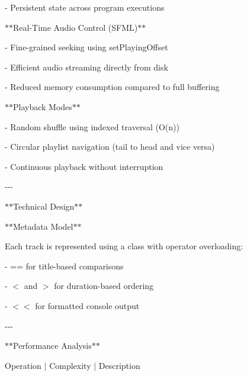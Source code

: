 -\/ Persistent state across program executions ~\newline


\texorpdfstring{$\ast$}{*}\texorpdfstring{$\ast$}{*}\+Real-\/\+Time Audio Control (SFML)\texorpdfstring{$\ast$}{*}\texorpdfstring{$\ast$}{*}

-\/ Fine-\/grained seeking using set\+Playing\+Offset ~\newline


-\/ Efficient audio streaming directly from disk ~\newline


-\/ Reduced memory consumption compared to full buffering ~\newline


\texorpdfstring{$\ast$}{*}\texorpdfstring{$\ast$}{*}\+Playback Modes\texorpdfstring{$\ast$}{*}\texorpdfstring{$\ast$}{*}

-\/ Random shuffle using indexed traversal (O(n)) ~\newline


-\/ Circular playlist navigation (tail to head and vice versa) ~\newline


-\/ Continuous playback without interruption ~\newline


-\/-\/-\/

\texorpdfstring{$\ast$}{*}\texorpdfstring{$\ast$}{*}\+Technical Design\texorpdfstring{$\ast$}{*}\texorpdfstring{$\ast$}{*}

\texorpdfstring{$\ast$}{*}\texorpdfstring{$\ast$}{*}\+Metadata Model\texorpdfstring{$\ast$}{*}\texorpdfstring{$\ast$}{*}

Each track is represented using a  class with operator overloading:\+

-\/ == for title-\/based comparisons ~\newline


-\/ \texorpdfstring{$<$}{<} and \texorpdfstring{$>$}{>} for duration-\/based ordering ~\newline


-\/ \texorpdfstring{$<$}{<}\texorpdfstring{$<$}{<} for formatted console output ~\newline


-\/-\/-\/

\texorpdfstring{$\ast$}{*}\texorpdfstring{$\ast$}{*}\+Performance Analysis\texorpdfstring{$\ast$}{*}\texorpdfstring{$\ast$}{*}

Operation \texorpdfstring{$\vert$}{|} Complexity \texorpdfstring{$\vert$}{|} Description

